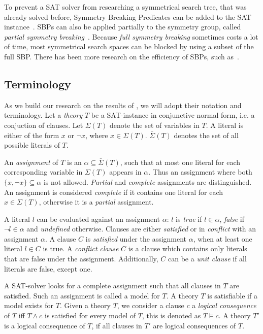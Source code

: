 To prevent a SAT solver from researching a symmetrical search tree, that was already solved
before, Symmetry Breaking Predicates can be added to the SAT
instance~\cite{sakallah2009symmetry}. SBPs can also be applied partially to the symmetry
group, called \textit{partial symmetry breaking}~\cite{sakallah2009symmetry}. Because
\textit{full symmetry breaking} sometimes costs a lot of time, most symmetrical search
spaces can be blocked by using a subset of the full SBP. There has been more research on
the efficiency of SBPs, such as~\cite{aloul2006efficient}.

\subsection{Terminology}
	As we build our research on the results of \cite{devriendt2012symmetry}, we will adopt
	their notation and terminology.
	Let a \emph{theory} $T$ be a SAT-instance in conjunctive normal form, i.e. a conjuction
	of clauses.
	Let $\Sigma(T)$ denote the set of variables in $T$.
	A literal is either of the form	$x$ or $\neg x$, where $x \in \Sigma(T)$.
	$\bar\Sigma(T)$ denotes the set of all possible literals of $T$.

	An \emph{assignment} of $T$ is an $\alpha \subseteq \bar\Sigma(T)$, such that at most
	one literal for each corresponding variable in $\Sigma(T)$ appears in $\alpha$.
	Thus an assignment where both $\{x, \neg x\} \subseteq \alpha$ is not allowed.
	\emph{Partial} and \emph{complete} assignments are distinguished.
	An assignment is considered \emph{complete} if it contains one literal for each $x \in \Sigma(T)$,
	otherwise it is a \emph{partial} assignment.

	A literal $l$ can be evaluated against an assignment $\alpha$: $l$ is \emph{true} if $l \in
	\alpha$, \emph{false} if $\neg l \in \alpha$ and \emph{undefined} otherwise.
	Clauses are either \emph{satisfied} or in \emph{conflict} with an assignment $\alpha$.
	A clause $C$ is \emph{satisfied} under the assignment $\alpha$,
	when at least one literal $l \in C$ is true.
	A \emph{conflict clause} $C$ is a clause which contains only literals that are false under the assignment.
	Additionally, $C$ can be a \emph{unit clause} if all literals are false, except one.

	A SAT-solver looks for a complete assignment such that all clauses in $T$ are satisfied.
	Such an assignment is called a model for $T$.
	A theory $T$ is satisfiable if a model exists for $T$.
	Given a theory $T$, we consider a clause $c$ a \emph{logical consequence} of $T$ iff
	$T \wedge c$ is satisfied for every model of $T$, this is denoted as $T \models c$.
	A theory $T'$ is a logical consequence of $T$, if all clauses in $T'$ are logical
	consequences of $T$.

